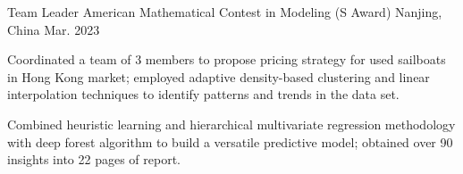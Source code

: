 

\begin{cventries}



  \cventry
    {Team Leader} %
    {American Mathematical Contest in Modeling (S Award)} %
    {Nanjing, China} %
    {Mar. 2023} %
    {
      \begin{cvitems} %
        \item {Coordinated a team of 3 members to propose pricing strategy for used sailboats in Hong Kong market; employed
        adaptive density-based clustering and linear interpolation techniques to identify patterns and trends in the data set.}
        \item {Combined heuristic learning and hierarchical multivariate regression methodology with deep forest algorithm to build a versatile predictive model; obtained over 90%
        insights into 22 pages of report.}
      \end{cvitems}
    }


\end{cventries}
